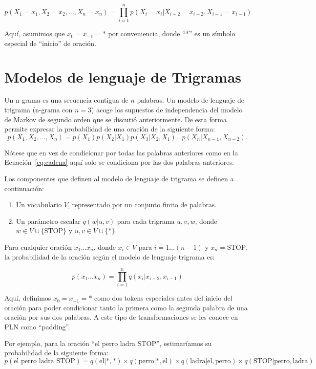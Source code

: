 \[
p(X_1 = x_1, X_2 = x_2, \ldots, X_n = x_n) = \prod_{i=1}^{n} p(X_i = x_i|X_{i-2} = x_{i-2}, X_{i-1} = x_{i-1})
\]

Aquí, asumimos que $x_0 = x_{-1} = *$ por conveniencia, donde ``*'' es un símbolo especial de ``inicio'' de oración.

\section{Modelos de lenguaje de Trigramas}

Un n-grama es una secuencia contigua de $n$ palabras. Un modelo de lenguaje de trigrama (n-grama con $n=3$) acoge los supuestos de independencia del modelo de Markov de segundo orden que se discutió anteriormente. De esta forma permite expresar la probabilidad de una oración de la siguiente forma:
\begin{equation}
p(X_1,X_2,\ldots,X_n)=p(X_1)p(X_2|X_1)p(X_3|X_2,X_1)\ldots p(X_n|X_{n-1},X_{n-2}).
\end{equation}

Nótese que en vez de condicionar por todas las palabras anteriores como en la Ecuación~\ref{eq:cadena} aquí solo se condiciona por las dos palabras anteriores.


Los componentes que definen al modelo de lenguaje de trigrama se definen a continuación:

\begin{enumerate}
  \item Un vocabulario $V$, representado por un conjunto finito de palabras.
  \item Un parámetro escalar $q(w|u, v)$ para cada trigrama $u, v, w$, donde $w \in V \cup \{\text{STOP}\}$ y $u, v \in V \cup \{*\}$.
\end{enumerate}

Para cualquier oración $x_1 \ldots x_n$, donde $x_i \in V$ para $i = 1 \ldots (n-1)$ y $x_n = \text{STOP}$, la probabilidad de la oración según el modelo de lenguaje trigrama es:

\[
p(x_1 \ldots x_n) = \prod_{i=1}^{n} q(x_i|x_{i-2}, x_{i-1})
\]

Aquí, definimos $x_0 = x_{-1} = *$ como dos tokens especiales antes del inicio del oración para poder condicionar tanto la primera como la segunda palabra de una oración por sus dos palabras. A este tipo de transformaciones se les conoce en PLN como ``padding''.

\begin{example}
Por ejemplo, para la oración ``el perro ladra STOP'', estimaríamos su probabilidad de la siguiente forma:
\[
p(\text{el perro ladra STOP}) = q(\text{el}|*, *) \times q(\text{perro}|*, \text{el}) \times q(\text{ladra}|\text{el}, \text{perro}) \times q(\text{STOP}|\text{perro}, \text{ladra})
\] 
\end{example}



